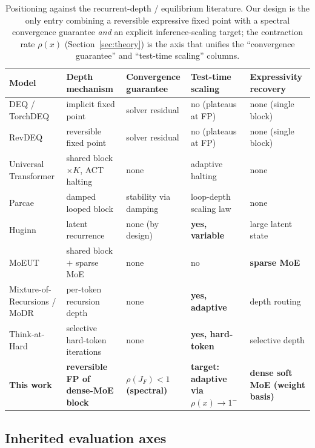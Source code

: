 \documentclass[11pt]{article}
\newcommand{\rhoF}{\rho(J_F)}
\begin{document}
\begin{table}[H]
\centering
\footnotesize
\renewcommand{\arraystretch}{1.25}
\begin{tabular}{@{}L{0.16\textwidth} L{0.155\textwidth} L{0.135\textwidth} L{0.12\textwidth} L{0.255\textwidth}@{}}
\toprule
\textbf{Model} & \textbf{Depth mechanism} & \textbf{Convergence guarantee} & \textbf{Test-time scaling} & \textbf{Expressivity recovery} \\
\midrule
DEQ / TorchDEQ & implicit fixed point & solver residual & no (plateaus at FP) & none (single block) \\
RevDEQ & reversible fixed point & solver residual & no (plateaus at FP) & none (single block) \\
Universal Transformer & shared block $\times K$, ACT halting & none & adaptive halting & none \\
Parcae & damped looped block & stability via damping & loop-depth scaling law & none \\
Huginn & latent recurrence & none (by design) & \textbf{yes, variable} & large latent state \\
MoEUT & shared block $+$ sparse MoE & none & no & \textbf{sparse MoE} \\
Mixture-of-Recursions / MoDR & per-token recursion depth & none & \textbf{yes, adaptive} & depth routing \\
Think-at-Hard & selective hard-token iterations & none & \textbf{yes, hard-token} & selective depth \\
\midrule
\textbf{This work} & \textbf{reversible FP of dense-MoE block} & \textbf{$\rhoF<1$ (spectral)} & \textbf{target: adaptive via $\rho(x)\!\to\!1^-$} & \textbf{dense soft MoE (weight basis)} \\
\bottomrule
\end{tabular}
\caption{Positioning against the recurrent-depth / equilibrium literature.  Our
design is the only entry combining a reversible expressive fixed point with a
spectral convergence guarantee \emph{and} an explicit inference-scaling target; the
contraction rate $\rho(x)$ (Section~\ref{sec:theory}) is the axis that unifies the
``convergence guarantee'' and ``test-time scaling'' columns.}
\label{tab:related}
\end{table}

\subsection{Inherited evaluation axes}
\label{sec:inherited}
\end{document}
